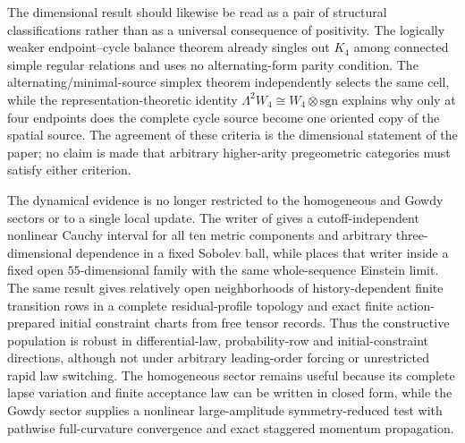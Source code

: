 \documentclass[11pt]{article}
\theoremstyle{definition}
\theoremstyle{remark}
\begin{document}
The dimensional result should likewise be read as a pair of structural
classifications rather than as a universal consequence of positivity.  The
logically weaker endpoint--cycle balance theorem already singles out $K_4$
among connected simple regular relations and uses no alternating-form parity
condition.  The alternating/minimal-source simplex theorem independently
selects the same cell, while the representation-theoretic identity
$\Lambda^2W_4\cong W_4\otimes\mathrm{sgn}$ explains why only at four endpoints
does the complete cycle source become one oriented copy of the spatial source.
The agreement of these criteria is the dimensional statement of the paper; no
claim is made that arbitrary higher-arity pregeometric categories must satisfy
either criterion.

The dynamical evidence is no longer restricted to the homogeneous and Gowdy
sectors or to a single local update.  The writer of
 gives a cutoff-independent nonlinear Cauchy
interval for all ten metric components and arbitrary three-dimensional
dependence in a fixed Sobolev ball, while
 places that writer inside a fixed open
$55$-dimensional family with the same whole-sequence Einstein limit.  The same
result gives relatively open neighborhoods of history-dependent finite
transition rows in a complete residual-profile topology and exact finite
action-prepared initial constraint charts from free tensor records.  Thus the
constructive population is robust in differential-law, probability-row and
initial-constraint directions, although not under arbitrary leading-order
forcing or unrestricted rapid law switching.  The homogeneous sector remains
useful because its complete lapse variation and finite acceptance law can be
written in closed form, while the Gowdy sector supplies a nonlinear
large-amplitude symmetry-reduced test with pathwise full-curvature convergence
and exact staggered momentum propagation.
\end{document}
